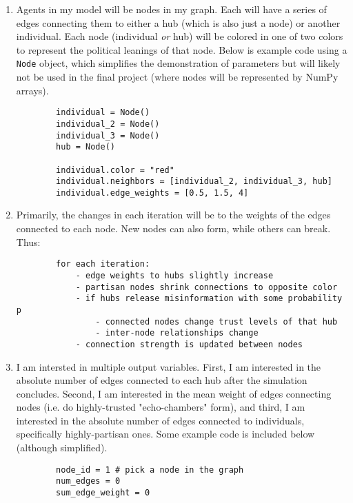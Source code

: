 \documentclass[titlepage, 12pt, leqno]{article}
\begin{document}
\begin{enumerate}
    \item Agents in my model will be nodes in my graph. Each will have a series of
        edges connecting them to either a hub (which is also just a node) or
        another individual. Each node (individual \textit{or} hub) will be 
        colored in one of two colors to represent the political leanings of that
        node. Below is example code using a \texttt{Node} object, which 
        simplifies the demonstration of parameters but will likely not be used
        in the final project (where nodes will be represented by NumPy arrays).
        \begin{verbatim}
        individual = Node()
        individual_2 = Node()
        individual_3 = Node()
        hub = Node()

        individual.color = "red"
        individual.neighbors = [individual_2, individual_3, hub]
        individual.edge_weights = [0.5, 1.5, 4]
        \end{verbatim}

    \item Primarily, the changes in each iteration will be to the weights of the
        edges connected to each node. New nodes can also form, while others can
        break. Thus:

        \begin{verbatim}
        for each iteration:
            - edge weights to hubs slightly increase
            - partisan nodes shrink connections to opposite color
            - if hubs release misinformation with some probability p
                - connected nodes change trust levels of that hub
                - inter-node relationships change
            - connection strength is updated between nodes
        \end{verbatim}

    \item I am intersted in multiple output variables. First, I am interested in
        the absolute number of edges connected to each hub after the simulation
        concludes. Second, I am interested in the mean weight of edges connecting
        nodes (i.e. do highly-trusted "echo-chambers" form), and third, I am 
        interested in the absolute number of edges connected to individuals,
        specifically highly-partisan ones. Some example code is included below
        (although simplified).

        \begin{verbatim}
        node_id = 1 # pick a node in the graph
        num_edges = 0
        sum_edge_weight = 0


\end{verbatim}
\end{enumerate}
\end{document}
